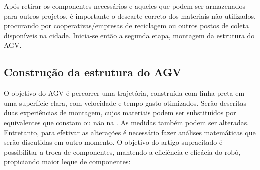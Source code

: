 \documentclass{textolivre}
\begin{document}


Após retirar os componentes necessários e aqueles que podem ser armazenados
para outros projetos, é importante o descarte correto dos materiais não
utilizados, procurando por cooperativas/empresas de reciclagem ou outros postos
de coleta disponíveis na cidade. Inicia-se então a segunda etapa, montagem da
estrutura do AGV.

\subsection{Construção da estrutura do AGV}\label{sec-constr-estr}
O objetivo do AGV é percorrer uma trajetória, construída com linha preta em uma
superfície clara, com velocidade e tempo gasto otimizados. Serão descritas duas
experiências de montagem, cujos materiais podem ser substituídos por
equivalentes que constam ou não na . As medidas também podem ser
alteradas. Entretanto, para efetivar as alterações é necessário fazer análises
matemáticas que serão discutidas em outro momento. O objetivo do artigo
supracitado é possibilitar a troca de componentes, mantendo a eficiência e
eficácia do robô, propiciando maior leque de componentes:
\end{document}

